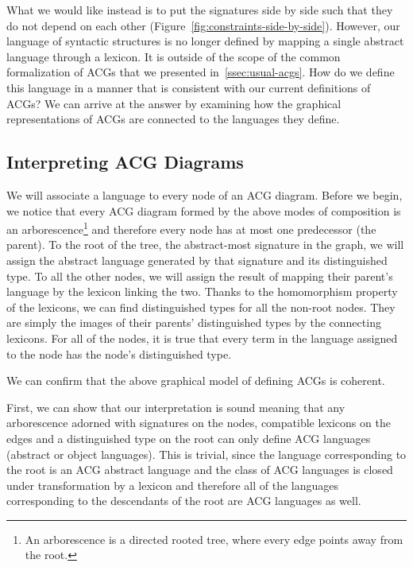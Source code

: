What we would like instead is to put the signatures side by side such
that they do not depend on each other
(Figure~\ref{fig:constraints-side-by-side}). However, our language of
syntactic structures is no longer defined by mapping a single abstract
language through a lexicon. It is outside of the scope of the common
formalization of ACGs that we presented in~\ref{ssec:usual-acgs}. How do
we define this language in a manner that is consistent with our current
definitions of ACGs? We can arrive at the answer by examining how the
graphical representations of ACGs are connected to the languages they
define.

\subsection{Interpreting ACG Diagrams}

We will associate a language to every node of an ACG diagram. Before we
begin, we notice that every ACG diagram formed by the above modes of
composition is an arborescence\footnote{An arborescence is a directed
  rooted tree, where every edge points away from the root.} and
therefore every node has at most one predecessor (the parent). To the
root of the tree, the abstract-most signature in the graph, we will
assign the abstract language generated by that signature and its
distinguished type. To all the other nodes, we will assign the result of
mapping their parent's language by the lexicon linking the two. Thanks
to the homomorphism property of the lexicons, we can find distinguished
types for all the non-root nodes. They are simply the images of their
parents' distinguished types by the connecting lexicons. For all of the
nodes, it is true that every term in the language assigned to the node
has the node's distinguished type.

We can confirm that the above graphical model of defining ACGs is
coherent.

First, we can show that our interpretation is sound meaning that any
arborescence adorned with signatures on the nodes, compatible lexicons
on the edges and a distinguished type on the root can only define ACG
languages (abstract or object languages). This is trivial, since the
language corresponding to the root is an ACG abstract language and the
class of ACG languages is closed under transformation by a lexicon and
therefore all of the languages corresponding to the descendants of the
root are ACG languages as well.

